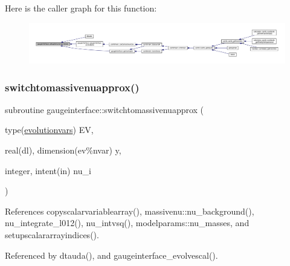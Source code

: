 Here is the caller graph for this function\+:
\nopagebreak
\begin{figure}[H]
\begin{center}
\leavevmode
\includegraphics[width=350pt]{namespacegaugeinterface_a21f6d1e93445d43fc8247f57dce52716_icgraph}
\end{center}
\end{figure}
\mbox{\label{namespacegaugeinterface_ac7f67b6e2bc871b4eb1a6d3453f796a3}} 
\subsubsection{\texorpdfstring{switchtomassivenuapprox()}{switchtomassivenuapprox()}}
{\footnotesize\ttfamily subroutine gaugeinterface\+::switchtomassivenuapprox (\begin{DoxyParamCaption}\item[{type(\mbox{\hyperlink{structgaugeinterface_1_1evolutionvars}{evolutionvars}})}]{EV,  }\item[{real(dl), dimension(ev\%nvar)}]{y,  }\item[{integer, intent(in)}]{nu\+\_\+i }\end{DoxyParamCaption})}



References copyscalarvariablearray(), massivenu\+::nu\+\_\+background(), nu\+\_\+integrate\+\_\+l012(), nu\+\_\+intvsq(), modelparams\+::nu\+\_\+masses, and setupscalararrayindices().



Referenced by dtauda(), and gaugeinterface\+\_\+evolvescal().

